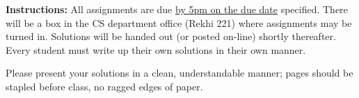 \documentclass[12pt,addpoints]{exam}
\begin{document}
\extrawidth{0.5in} \extrafootheight{-0in} \pagestyle{headandfoot}
\headrule {} \footrule {}


\noindent \textbf{Instructions:} All assignments are due \underline{by 5pm on the due date} specified.  There will be a box in the CS department office (Rekhi 221) where assignments may be turned in.  Solutions will be handed out (or posted on-line) shortly thereafter.  Every student
must write up their own solutions in their own manner.

\smallskip
\noindent Please present your solutions in a clean, understandable
manner; pages should be stapled before class, no ragged edges of
paper.
\end{document}
